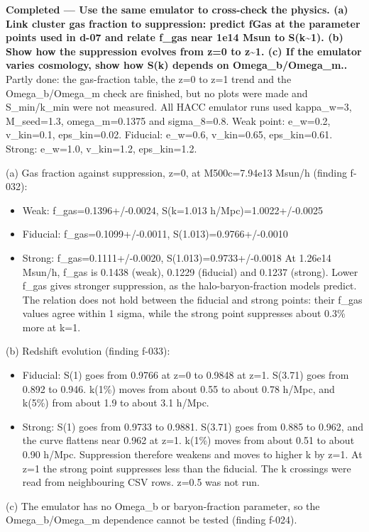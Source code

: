 \documentclass[11pt,a4paper]{article}
\begin{document}
\textbf{Completed --- Use the same emulator to cross-check the physics. (a) Link cluster gas fraction to suppression: predict fGas at the parameter points used in d-07 and relate f\_gas near 1e14 Msun to S(k\textasciitilde{}1). (b) Show how the suppression evolves from z=0 to z\textasciitilde{}1. (c) If the emulator varies cosmology, show how S(k) depends on Omega\_b/Omega\_m..} Partly done: the gas-fraction table, the z=0 to z=1 trend and the Omega\_b/Omega\_m check are finished, but no plots were made and S\_min/k\_min were not measured. All HACC emulator runs used kappa\_w=3, M\_seed=1.3, omega\_m=0.1375 and sigma\_8=0.8. Weak point: e\_w=0.2, v\_kin=0.1, eps\_kin=0.02. Fiducial: e\_w=0.6, v\_kin=0.65, eps\_kin=0.61. Strong: e\_w=1.0, v\_kin=1.2, eps\_kin=1.2.

(a) Gas fraction against suppression, z=0, at M500c=7.94e13 Msun/h (finding f-032):

\begin{itemize}
  \item Weak: f\_gas=0.1396+/-0.0024, S(k=1.013 h/Mpc)=1.0022+/-0.0025
  \item Fiducial: f\_gas=0.1099+/-0.0011, S(1.013)=0.9766+/-0.0010
  \item Strong: f\_gas=0.1111+/-0.0020, S(1.013)=0.9733+/-0.0018
At 1.26e14 Msun/h, f\_gas is 0.1438 (weak), 0.1229 (fiducial) and 0.1237 (strong). Lower f\_gas gives stronger suppression, as the halo-baryon-fraction models predict. The relation does not hold between the fiducial and strong points: their f\_gas values agree within 1 sigma, while the strong point suppresses about 0.3\% more at k=1.

\end{itemize}
(b) Redshift evolution (finding f-033):

\begin{itemize}
  \item Fiducial: S(1) goes from 0.9766 at z=0 to 0.9848 at z=1. S(3.71) goes from 0.892 to 0.946. k(1\%) moves from about 0.55 to about 0.78 h/Mpc, and k(5\%) from about 1.9 to about 3.1 h/Mpc.
  \item Strong: S(1) goes from 0.9733 to 0.9881. S(3.71) goes from 0.885 to 0.962, and the curve flattens near 0.962 at z=1. k(1\%) moves from about 0.51 to about 0.90 h/Mpc.
Suppression therefore weakens and moves to higher k by z=1. At z=1 the strong point suppresses less than the fiducial. The k crossings were read from neighbouring CSV rows. z=0.5 was not run.

\end{itemize}
(c) The emulator has no Omega\_b or baryon-fraction parameter, so the Omega\_b/Omega\_m dependence cannot be tested (finding f-024).
\end{document}
